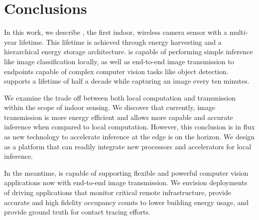 \section{Conclusions}

In this work, we describe \name, the first indoor, wireless camera sensor with a multi-year lifetime. This lifetime is achieved through energy harvesting and a hierarchical energy storage architecture. 
\name is capable of performing simple inference like image classification locally, as well as end-to-end image transmission to endpoints capable of complex computer vision tasks like object detection. \name supports a lifetime of half a decade while capturing an image every ten minutes.

We examine the trade off between both local computation and transmission within the scope of indoor sensing. We discover that currently, image transmission is more energy efficient and allows more capable and accurate inference when compared to local computation. However, this conclusion is in flux as new technology to accelerate inference at the edge is on the horizon. We design \name as a platform that can readily integrate new processors and accelerators for local inference.

In the meantime, \name is capable of supporting flexible and powerful computer vision applications now with end-to-end image transmission. We envision deployments of \names driving applications that monitor critical remote infrastructure, provide accurate and high fidelity occupancy counts to lower building energy usage, and provide ground truth for contact tracing efforts.

